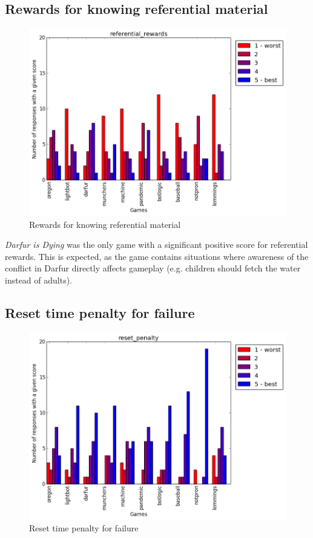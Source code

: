 			\subsection{Rewards for knowing referential material}
				\begin{figure}[] 
				\centering 
				\includegraphics[width=\textwidth, height=.4\textheight, keepaspectratio=true]{referential_rewards_scores.png} 
				\caption{Rewards for knowing referential material}
				\end{figure}

				\textit{Darfur is Dying} was the only game with a significant positive score for referential rewards. This is expected, as the game contains situations where awareness of the conflict in Darfur directly affects gameplay (e.g. children should fetch the water instead of adults).

			\subsection{Reset time penalty for failure}
				\begin{figure}[] 
				\centering 
				\includegraphics[width=\textwidth, height=.4\textheight, keepaspectratio=true]{reset_penalty_scores.png} 
				\caption{Reset time penalty for failure}
				\end{figure}

